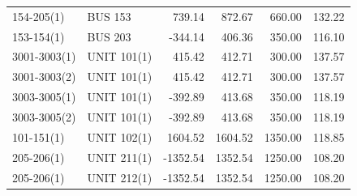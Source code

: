 \documentclass[10pt]{report}
\begin{document}
\begin{table}[H]
{\begin{tabular}{llrrrr}
154-205(1) & BUS 153 & 739.14 & 872.67 & 660.00 & 132.22 \\
153-154(1) & BUS 203 & -344.14 & 406.36 & 350.00 & 116.10 \\
3001-3003(1) & UNIT 101(1) & 415.42 & 412.71 & 300.00 & 137.57 \\
3001-3003(2) & UNIT 101(1) & 415.42 & 412.71 & 300.00 & 137.57 \\
3003-3005(1) & UNIT 101(1) & -392.89 & 413.68 & 350.00 & 118.19 \\
3003-3005(2) & UNIT 101(1) & -392.89 & 413.68 & 350.00 & 118.19 \\
101-151(1) & UNIT 102(1) & 1604.52 & 1604.52 & 1350.00 & 118.85 \\
205-206(1) & UNIT 211(1) & -1352.54 & 1352.54 & 1250.00 & 108.20 \\
205-206(1) & UNIT 212(1) & -1352.54 & 1352.54 & 1250.00 & 108.20 \\
\bottomrule
\end{tabular}}
\end{table}
\end{document}
